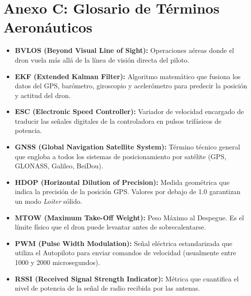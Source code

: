 \documentclass[11pt,a4paper]{article}
\begin{document}
\section{Anexo C: Glosario de Términos Aeronáuticos}
\begin{itemize}[leftmargin=*]
    \item \textbf{BVLOS (Beyond Visual Line of Sight):} Operaciones aéreas donde el dron vuela más allá de la línea de visión directa del piloto.
    \item \textbf{EKF (Extended Kalman Filter):} Algoritmo matemático que fusiona los datos del GPS, barómetro, giroscopio y acelerómetro para predecir la posición y actitud del dron.
    \item \textbf{ESC (Electronic Speed Controller):} Variador de velocidad encargado de traducir las señales digitales de la controladora en pulsos trifásicos de potencia.
    \item \textbf{GNSS (Global Navigation Satellite System):} Término técnico general que engloba a todos los sistemas de posicionamiento por satélite (GPS, GLONASS, Galileo, BeiDou).
    \item \textbf{HDOP (Horizontal Dilution of Precision):} Medida geométrica que indica la precisión de la posición GPS. Valores por debajo de 1.0 garantizan un modo \textit{Loiter} sólido.
    \item \textbf{MTOW (Maximum Take-Off Weight):} Peso Máximo al Despegue. Es el límite físico que el dron puede levantar antes de sobrecalentarse.
    \item \textbf{PWM (Pulse Width Modulation):} Señal eléctrica estandarizada que utiliza el Autopiloto para enviar comandos de velocidad (usualmente entre 1000 y 2000 microsegundos).
    \item \textbf{RSSI (Received Signal Strength Indicator):} Métrica que cuantifica el nivel de potencia de la señal de radio recibida por las antenas.
\end{itemize}
\end{document}
